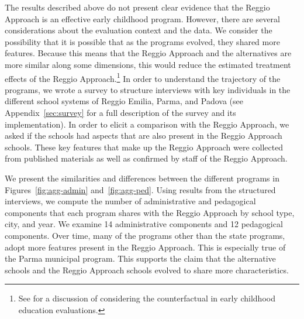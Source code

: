 
The results described above do not present clear evidence that the Reggio Approach is an effective early childhood program. However, there are several considerations about the evaluation context and the data. We consider the possibility that it is possible that as the programs evolved, they shared more features. Because this means that the Reggio Approach and the alternatives are more similar along some dimensions, this would reduce the estimated treatment effects of the Reggio Approach.\footnote{See \citet{Elango_Hojman_etal_2016_Early-Edu} for a discussion of considering the counterfactual in early childhood education evaluations.} In order to understand the trajectory of the programs, we wrote a survey to structure interviews with key individuals in the different school systems of Reggio Emilia, Parma, and Padova (see Appendix~\ref{sec:survey} for a full description of the survey and its implementation). In order to elicit a comparison with the Reggio Approach, we asked if the schools had aspects that are also present in the Reggio Approach schools. These key features that make up the Reggio Approach were collected from published materials as well as confirmed by staff of the Reggio Approach. 

We present the similarities and differences between the different programs in Figures~\ref{fig:agg-admin} and~\ref{fig:agg-ped}. Using results from the structured interviews, we compute the number of administrative and pedagogical components that each program shares with the Reggio Approach by school type, city, and year. We examine 14 administrative components and 12 pedagogical components. Over time, many of the programs other than the state programs, adopt more features present in the Reggio Approach. This is especially true of the Parma municipal program. This supports the claim that the alternative schools and the Reggio Approach schools evolved to share more characteristics.

